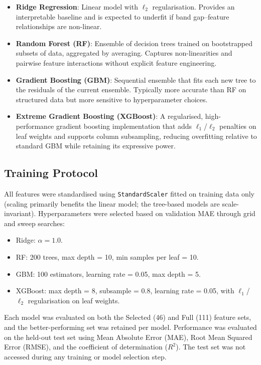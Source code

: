 \documentclass[conference]{IEEEtran}
\begin{document}
\begin{itemize}
  \item \textbf{Ridge Regression}: Linear model with $\ell_2$ regularisation. Provides an interpretable baseline and is expected to underfit if band gap--feature relationships are non-linear.
  \item \textbf{Random Forest (RF)}: Ensemble of decision trees trained on bootstrapped subsets of data, aggregated by averaging. Captures non-linearities and pairwise feature interactions without explicit feature engineering.
  \item \textbf{Gradient Boosting (GBM)}: Sequential ensemble that fits each new tree to the residuals of the current ensemble. Typically more accurate than RF on structured data but more sensitive to hyperparameter choices.
  \item \textbf{Extreme Gradient Boosting (XGBoost)}: A regularised, high-performance gradient boosting implementation that adds $\ell_1$/$\ell_2$ penalties on leaf weights and supports column subsampling, reducing overfitting relative to standard GBM while retaining its expressive power.
\end{itemize}

\subsection{Training Protocol}

All features were standardised using \texttt{StandardScaler} fitted on training data only (scaling primarily benefits the linear model; the tree-based models are scale-invariant). Hyperparameters were selected based on validation MAE through grid and sweep searches:

\begin{itemize}
  \item Ridge: $\alpha = 1.0$.
  \item RF: 200 trees, max depth = 10, min samples per leaf = 10.
  \item GBM: 100 estimators, learning rate = 0.05, max depth = 5.
  \item XGBoost: max depth = 8, subsample = 0.8, learning rate = 0.05, with $\ell_1$/$\ell_2$ regularisation on leaf weights.
\end{itemize}

Each model was evaluated on both the Selected (46) and Full (111) feature sets, and the better-performing set was retained per model. Performance was evaluated on the held-out test set using Mean Absolute Error (MAE), Root Mean Squared Error (RMSE), and the coefficient of determination ($R^2$). The test set was not accessed during any training or model selection step.
\end{document}
